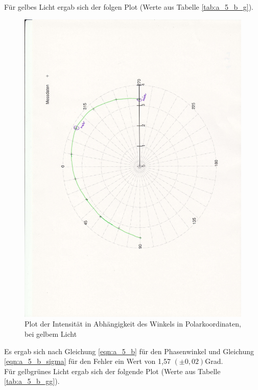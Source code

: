 \documentclass[12pt]{scrartcl}
\begin{document}
\begin{enumerate}
Für gelbes Licht ergab sich der folgen Plot (Werte aus Tabelle \ref{tab:a_5_b_g}).

\begin{figure}[H]
\centering
    \includegraphics[scale = 0.3, angle = -90]{a_5_g.pdf}
  	\caption[Plot der Intensität in Abhängigkeit des Winkels in Polarkoordinaten, bei gelbem Licht]{Plot der Intensität in Abhängigkeit des Winkels in Polarkoordinaten, bei gelbem Licht}
  \label{fig:a_5_g}
\end{figure}


Es ergab sich nach Gleichung \ref{eqn:a_5_b} für den Phasenwinkel und Gleichung \ref{eqn:a_5_b_sigma} für den Fehler ein Wert von 1,57 $(\pm 0,02)$Grad.\\


Für gelbgrünes Licht ergab sich der folgende Plot (Werte aus Tabelle \ref{tab:a_5_b_gg}).


\end{enumerate}
\end{document}
